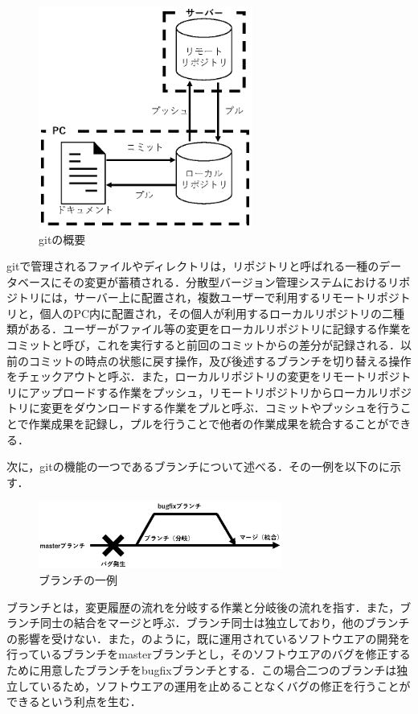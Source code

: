 \documentclass[a4paper,9pt,twocolumn]{jsarticle}
\begin{document}
\begin{figure}[h]
\centering
\includegraphics[width=70mm]{img/git.eps}
\caption{gitの概要}
\label{git}
\end{figure}

gitで管理されるファイルやディレクトリは，リポジトリと呼ばれる一種のデータベースにその変更が蓄積される．分散型バージョン管理システムにおけるリポジトリには，サーバー上に配置され，複数ユーザーで利用するリモートリポジトリと，個人のPC内に配置され，その個人が利用するローカルリポジトリの二種類がある．ユーザーがファイル等の変更をローカルリポジトリに記録する作業をコミットと呼び，これを実行すると前回のコミットからの差分が記録される．以前のコミットの時点の状態に戻す操作，及び後述するブランチを切り替える操作をチェックアウトと呼ぶ．また，ローカルリポジトリの変更をリモートリポジトリにアップロードする作業をプッシュ，リモートリポジトリからローカルリポジトリに変更をダウンロードする作業をプルと呼ぶ．コミットやプッシュを行うことで作業成果を記録し，プルを行うことで他者の作業成果を統合することができる．

次に，gitの機能の一つであるブランチについて述べる．その一例を以下のに示す．

\begin{figure}[h]
\centering
\includegraphics[width=80mm]{img/branch.eps}
\caption{ブランチの一例}
\label{branch}
\end{figure}

ブランチとは，変更履歴の流れを分岐する作業と分岐後の流れを指す．また，ブランチ同士の結合をマージと呼ぶ．ブランチ同士は独立しており，他のブランチの影響を受けない．また，のように，既に運用されているソフトウエアの開発を行っているブランチをmasterブランチとし，そのソフトウエアのバグを修正するために用意したブランチをbugfixブランチとする．この場合二つのブランチは独立しているため，ソフトウエアの運用を止めることなくバグの修正を行うことができるという利点を生む．
\end{document}
